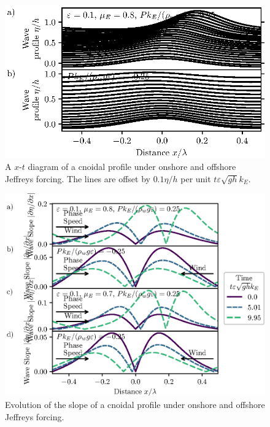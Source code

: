\documentclass{jfm}
\renewcommand*{\epsilon}{\varepsilon}
\begin{document}
\begin{figure}
  \centering
  \includegraphics{XT-Offset-Cnoidal.eps}
  \caption{
    A $x$-$t$ diagram of a cnoidal profile under onshore and offshore
    Jeffreys forcing.
    The lines are offset by $0.1 \eta/h$ per unit $t \epsilon \sqrt{g h}
    k_E$.
  }
\end{figure}

\begin{figure}
  \centering
  \includegraphics{Slopes-Positive-Negative-Cnoidal.eps}
  \caption{
    Evolution of the slope of a cnoidal profile under onshore and
    offshore Jeffreys forcing.
  }
\end{figure}
\end{document}
